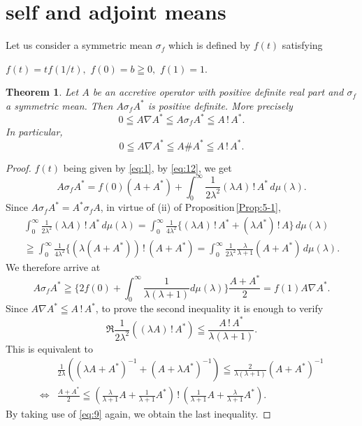 \documentclass[reqno]{amsart}
\newtheorem{theorem}{Theorem}[section]
\theoremstyle{definition}
\theoremstyle{remark}
\begin{document}
\section{self and adjoint means}
Let us consider a symmetric mean $\sigma_f$ which is defined by $f(t)$ satisfying 
\begin{center}
$f(t)= t f(1/t), \,\,f(0)=b \geqq 0, \,\, f(1)=1$.
\end{center}  
\begin{theorem}\label{Th:6-1}
Let $A$ be an accretive operator with positive definite real part and 
$\sigma _f$ a symmetric mean. Then 
$A \sigma _f  A^*$ is positive definite. More precisely 
\begin{equation*}
0\leqq A\nabla A^* \leqq A \sigma _f  A^* \leqq A \,!\, A^*.
\end{equation*}
In particular, 
$$
0\leqq A\nabla A^* \leqq A \# A^* \leqq A \,!\, A^*.$$
\end{theorem}
\begin{proof} 
$f(t)$ being given by \eqref{eq:1}, by \eqref{eq:12}, we get
$$ A\sigma_f A^* = f(0) (A + A^*) + \int_0^{\infty} 
\frac{1}{2\lambda^2}  (\lambda A) \,!\, A^* \, d \mu (\lambda).$$
Since $A\sigma_f A^* = A^* \sigma_f A$,  in virtue of (ii) of Proposition\,\ref{Prop:5-1},
\begin{gather*}
\int_0^{\infty}\frac{1}{2\lambda^2}  (\lambda A) \,!\, A^* \, d \mu (\lambda) =
\int_0^{\infty}\frac{1}{4\lambda^2}  \{(\lambda A) \,!\, A^* +  (\lambda A^*) \,!\, A \}\, d \mu (\lambda)\\
\geqq \int_0^{\infty}\frac{1}{4\lambda^2}  \{(\lambda (A + A^*)) \,!\, (A + A^*) =
\int_0^{\infty}\frac{1}{2\lambda^2}  \frac{\lambda}{\lambda + 1} (A + A^*) \,d \mu(\lambda).
\end{gather*}
We therefore arrive at 
$$ A\sigma_f A^* \geqq \{2 f(0) + \int_0^{\infty} 
\frac{1}{\lambda  (\lambda +1)}d \mu (\lambda) \}\frac{A + A^*}{2}= f(1) 
A\nabla A^*.$$
 Since $A\nabla A^* \leqq A\,!\, A^*$, to prove  the second inequality 
it is enough to verify 
$$\Re \frac{1}{2\lambda ^2} ((\lambda A) \,!\, A^*) \leqq \frac{A\,!\, A^*}
{\lambda (\lambda +1)}.$$ This is equivalent to 
\begin{align*}
&\frac{1}{2\lambda}\left( (\lambda A + A^*)^{-1} + (A + \lambda A^*)^{-1}\right)
\leqq \frac{2}{\lambda (\lambda + 1)}(A + A^*)^{-1}\\
\Longleftrightarrow & \frac{A + A^*}{2} \leqq (\frac{\lambda}{\lambda + 1} A + 
\frac{1}{\lambda + 1}A^*) \,!\,  (\frac{1}{\lambda + 1} A + 
\frac{\lambda}{\lambda + 1}A^*).
\end{align*}
By taking use of \eqref{eq:9} again, we obtain the last inequality. 
\end{proof}
\end{document}
